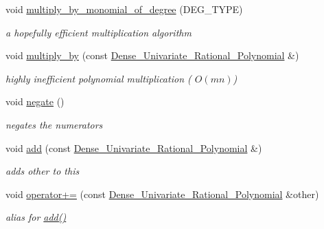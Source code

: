 \begin{Indent}
\begin{DoxyCompactItemize}
void \hyperlink{group__polygroup_ab21b7f1a23165a93293db98129fdd48c}{multiply\+\_\+by\+\_\+monomial\+\_\+of\+\_\+degree} (D\+E\+G\+\_\+\+T\+Y\+PE)
\begin{DoxyCompactList}\small\item\em a hopefully efficient multiplication algorithm \end{DoxyCompactList}\item 
\mbox{\label{group__polygroup_af73d51542118ec7fbe36757b2590220e}} 
void \hyperlink{group__polygroup_af73d51542118ec7fbe36757b2590220e}{multiply\+\_\+by} (const \hyperlink{group__polygroup_class_dense___univariate___rational___polynomial}{Dense\+\_\+\+Univariate\+\_\+\+Rational\+\_\+\+Polynomial} \&)
\begin{DoxyCompactList}\small\item\em highly inefficient polynomial multiplication ( $O(mn)$) \end{DoxyCompactList}\item 
\mbox{\label{group__polygroup_a4086e22f45503e348985f120b3c0a79c}} 
void \hyperlink{group__polygroup_a4086e22f45503e348985f120b3c0a79c}{negate} ()
\begin{DoxyCompactList}\small\item\em negates the numerators \end{DoxyCompactList}\item 
\mbox{\label{group__polygroup_a8cf0a014475645d777b7f3168d632a93}} 
void \hyperlink{group__polygroup_a8cf0a014475645d777b7f3168d632a93}{add} (const \hyperlink{group__polygroup_class_dense___univariate___rational___polynomial}{Dense\+\_\+\+Univariate\+\_\+\+Rational\+\_\+\+Polynomial} \&)
\begin{DoxyCompactList}\small\item\em adds {\ttfamily other} to {\ttfamily this} \end{DoxyCompactList}\item 
\mbox{\label{group__polygroup_a61d2068402442a595dde1fcc4dc40f52}} 
void \hyperlink{group__polygroup_a61d2068402442a595dde1fcc4dc40f52}{operator+=} (const \hyperlink{group__polygroup_class_dense___univariate___rational___polynomial}{Dense\+\_\+\+Univariate\+\_\+\+Rational\+\_\+\+Polynomial} \&other)
\begin{DoxyCompactList}\small\item\em alias for \hyperlink{group__polygroup_a8cf0a014475645d777b7f3168d632a93}{add()} \end{DoxyCompactList}\item 

\end{DoxyCompactItemize}
\end{Indent}
